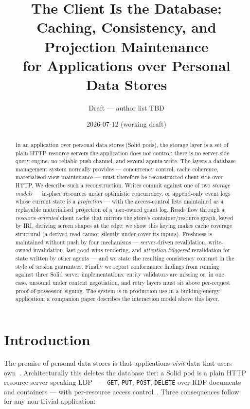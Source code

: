 \documentclass[11pt,a4paper]{article}
\title{The Client Is the Database:\\ Caching, Consistency, and Projection Maintenance\\ for Applications over Personal Data Stores}
\author{Draft --- author list TBD}
\date{2026-07-12 (working draft)}
\theoremstyle{remark}
\newcommand{\code}[1]{\texttt{#1}}
\begin{document}
\maketitle

\begin{abstract}
In an application over personal data stores (Solid pods), the storage layer is a
set of plain HTTP resource servers the application does not control: there is no
server-side query engine, no reliable push channel, and several agents write. The
layers a database management system normally provides --- concurrency control,
cache coherence, materialised-view maintenance --- must therefore be
reconstructed client-side over HTTP. We describe such a reconstruction. Writes
commit against one of two \emph{storage models} --- in-place resources under
optimistic concurrency, or append-only event logs whose current state is a
\emph{projection} --- with the access-control lists maintained as a replayable
materialised projection of a user-owned grant log. Reads flow through a
\emph{resource-oriented} client cache that mirrors the store's container/resource
graph, keyed by IRI, deriving screen shapes at the edge; we show this keying makes
cache coverage structural (a derived read cannot silently under-cover its inputs).
Freshness is maintained without push by four mechanisms --- server-driven
revalidation, write-owned invalidation, last-good-wins rendering, and
\emph{attention-triggered} revalidation for state written by other agents --- and
we state the resulting consistency contract in the style of session guarantees.
Finally we report conformance findings from running against three Solid server
implementations: entity validators are missing or, in one case, unsound under
content negotiation, and retry layers must sit above per-request proof-of-possession
signing. The system is in production use in a building-energy application; a
companion paper describes the interaction model above this layer.
\end{abstract}

\section{Introduction}\label{sec:intro}

The premise of personal data stores is that applications \emph{visit} data that
users own~\cite{solid}. Architecturally this deletes the database tier: a Solid
pod is a plain HTTP resource server speaking LDP~\cite{ldp} --- \code{GET},
\code{PUT}, \code{POST}, \code{DELETE} over RDF documents and containers --- with
per-resource access control~\cite{wac}. Three consequences follow for any
non-trivial application:
\end{document}
